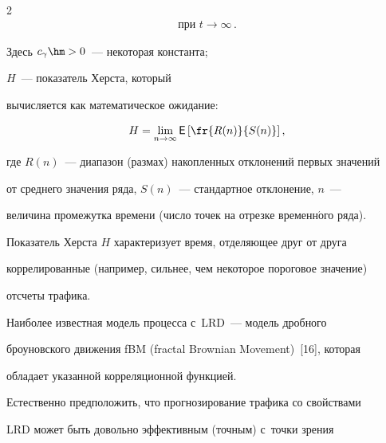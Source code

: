 \begin{multicols}{2}
\begin{multline*}
\mbox{при }   t \to \infty\,.


  \end{multline*}


  


  \vspace*{-4pt}


  


  \noindent


 Здесь $c_\gamma\hm>0$~--- некоторая константа;   


$H$~--- показатель Херста,  который


вычисляется как математическое ожидание:


  $$


  H=\lim\limits_{n\to\infty} {\sf E}\left [\fr{R(n)}{S(n)}\right],


  $$


  


   \vspace*{-3pt}


  


  \noindent


где $R(n)$~--- диапазон (размах) накопленных отклонений первых значений 


от среднего значения ряда, $S(n)$~--- стандартное отклонение, $n$~--- 


величина промежутка времени (число точек на отрезке временн$\acute{\mbox{о}}$го ряда). 





  Показатель Херста $H$ характеризует время, отделяющее друг от друга 


коррелированные (например, сильнее, чем некоторое пороговое значение) 


отсчеты трафика.


  


  Наиболее известная модель процесса с~LRD~--- модель дробного 


броуновского движения fBM (fractal Brownian Movement)~[16], которая 


обладает указанной корреляционной функцией.


  


  Естественно предположить, что прогнозирование трафика со свойствами 


LRD может быть довольно эффективным (точным) с~точки зрения 



\end{multicols}

